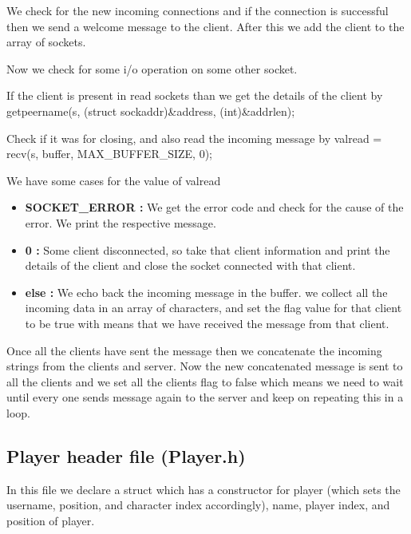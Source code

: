 \documentclass{article}
\begin{document}
We check for the new incoming connections and if the connection is successful then we send a welcome message to the client. After this we add the client to the array of sockets.
\newline

Now we check for some i/o operation on some other socket. \newline

If the client is present in read sockets than we get the details of the client by getpeername(s, (struct sockaddr\*)\&address, (int\*)\&addrlen); \newline

Check if it was for closing, and also read the incoming message by valread = recv(s, buffer, MAX\_BUFFER\_SIZE, 0); \newline

We have some cases for the value of valread \\
\begin{itemize}
    \item \textbf{SOCKET\_ERROR :} We get the error code and check for the cause of the error. We print the respective message. \\
    \item \textbf{0 :} Some client disconnected, so take that client information and print the details of the client and close the socket connected with that client. \\
    \item \textbf{else :} We echo back the incoming message in the buffer. we collect all the incoming data in an array of characters, and set the flag value for that client to be true with means that we have received the message from that client. \\
\end{itemize}

Once all the clients have sent the message then we concatenate the incoming strings from the clients and server. Now the new concatenated message is sent to all the clients and we set all the clients flag to false which means we need to wait until every one sends message again to the server and keep on repeating this in a loop.

\subsection{Player header file (Player.h)}
In this file we declare a struct which has a constructor for player (which sets the username, position, and character index accordingly), name, player index, and position of player. 
\newline

\vspace{300px}
\end{document}
